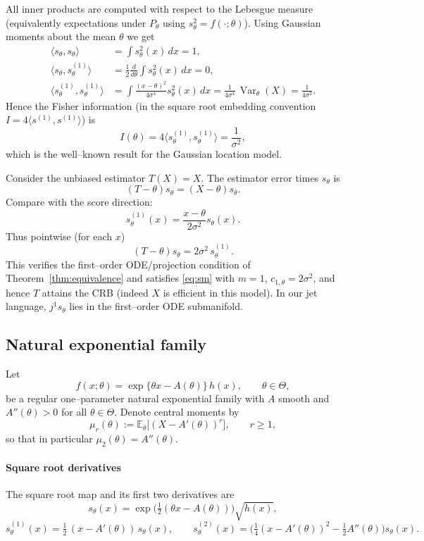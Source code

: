 \documentclass[3p,times]{elsarticle}
\begin{document}
All inner products are computed with respect to the Lebesgue measure (equivalently expectations under $P_\theta$ using $s_\theta^2=f(\cdot;\theta)$). Using Gaussian moments about the mean $\theta$ we get
\begin{align*}
\langle s_\theta, s_\theta\rangle &= \int s_\theta^2(x)\,dx = 1,\\
\langle s_\theta, s_\theta^{(1)}\rangle &= \tfrac12\frac{d}{d\theta}\int s_\theta^2(x)\,dx = 0,\\
\langle s_\theta^{(1)}, s_\theta^{(1)}\rangle
&= \int \frac{(x-\theta)^2}{4\sigma^4}s_\theta^2(x)\,dx
= \frac{1}{4\sigma^4}\,\operatorname{Var}_\theta(X)
= \frac{1}{4\sigma^2}.
\end{align*}
Hence the Fisher information (in the square root embedding convention \(I=4\langle s^{(1)},s^{(1)}\rangle\)) is
\[
I(\theta)=4\langle s_\theta^{(1)},s_\theta^{(1)}\rangle=\frac{1}{\sigma^2},
\]
which is the well--known result for the Gaussian location model.

Consider the unbiased estimator $T(X)=X$. The estimator error times $s_\theta$ is
\[
(T-\theta)s_\theta = (X-\theta)s_\theta.
\]
Compare with the score direction:
\[
s_\theta^{(1)}(x)=\frac{x-\theta}{2\sigma^2}s_\theta(x).
\]
Thus pointwise (for each $x$)
\[
(T-\theta)s_\theta = 2\sigma^2\, s_\theta^{(1)}.
\]
This verifies the first--order ODE/projection condition of Theorem~\ref{thm:equivalence} and satisfies \eqref{eq:sm} with $m=1$, $c_{1,\theta}=2\sigma^2$, and hence $T$ attains the CRB (indeed $X$ is efficient in this model). In our jet language, $j^1 s_\theta$ lies in the first--order ODE submanifold.

\subsection{Natural exponential family}
\label{sec:expfam-example}

Let
\[
f(x;\theta)=\exp\{\theta x - A(\theta)\}\,h(x),\qquad \theta\in\Theta,
\]
be a regular one--parameter natural exponential family with $A$ smooth and
$A''(\theta)>0$ for all $\theta\in\Theta$.  
Denote central moments by
\[
\mu_r(\theta):=\mathbb{E}_\theta\big[(X-A'(\theta))^r\big],\qquad r\ge1,
\]
so that in particular $\mu_2(\theta)=A''(\theta)$.

\paragraph{Square root derivatives}
The square root map and its first two derivatives are
\[
s_\theta(x)=\exp\!\Big(\tfrac12(\theta x - A(\theta))\Big)\sqrt{h(x)},
\]
\[
s_\theta^{(1)}(x)=\tfrac12\,(x-A'(\theta))\,s_\theta(x),
\qquad
s_\theta^{(2)}(x)=\Big(\tfrac14(x-A'(\theta))^2-\tfrac12 A''(\theta)\Big)s_\theta(x).
\]
\end{document}

